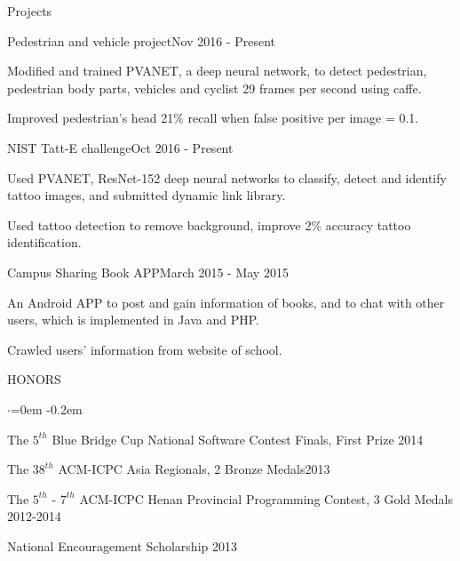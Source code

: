 \documentclass{resume} %
\begin{document}
\begin{rSection}{Projects}


\begin{rSubsection}{Pedestrian and vehicle project}{Nov 2016 - Present}{}{}
\item Modified and trained PVANET, a deep neural network,  to detect pedestrian, pedestrian body parts, vehicles and cyclist 29 frames per second using caffe.
\item Improved pedestrian's head 21\% recall when false positive per image = 0.1.
\end{rSubsection}


\begin{rSubsection}{NIST Tatt-E challenge}{Oct 2016 - Present}{}{}
\item Used PVANET, ResNet-152 deep neural networks to classify, detect and identify tattoo images, and submitted dynamic link library. 
\item Used tattoo detection to remove background, improve 2\% accuracy tattoo identification.
\end{rSubsection}

\begin{rSubsection}{Campus Sharing Book APP}{March 2015 - May 2015}{}{}
\item An Android APP to post and gain information of books, and to chat with other users, which is implemented in Java and PHP.
\item Crawled users' information from website of school.
\end{rSubsection}


\end{rSection}



\begin{rSection}{HONORS}
\begin{list}{$\cdot$}{\leftmargin=0em}
\itemsep -0.2em \vspace{0em}
\item The $5^{th}$ Blue Bridge Cup National Software Contest Finals, First Prize \hfill {2014}
\item The $38^{th}$ ACM-ICPC Asia Regionals, 2 Bronze Medals\hfill {2013}
\item The $5^{th}$ - $7^{th}$ ACM-ICPC Henan Provincial Programming Contest, 3 Gold Medals \hfill {2012-2014}
\item National Encouragement Scholarship \hfill {2013}
\end{list}
\vspace{0.5em}
\end{rSection}
\end{document}
